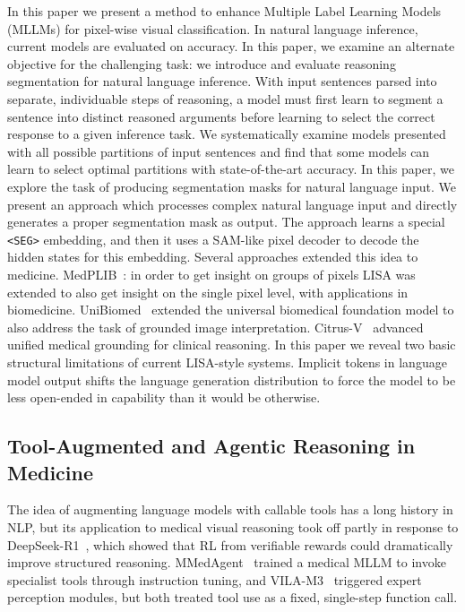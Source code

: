 \documentclass[12pt, a4paper]{article}
\begin{document}
In this paper we present a method to enhance Multiple Label Learning Models (MLLMs)
for pixel-wise visual classification.
In natural language inference, current models are evaluated on accuracy.
In this paper, we examine an alternate objective for the challenging task: we introduce
and evaluate reasoning segmentation for natural language inference.
With input sentences parsed into separate, individuable steps of reasoning, a model
must first learn to segment a sentence into distinct reasoned arguments before learning
to select the correct response to a given inference task.
We systematically examine models presented with all possible partitions of input
sentences and find that some models can learn to select optimal partitions with
state-of-the-art accuracy.
In this paper, we explore the task of producing segmentation masks for natural language
input.
We present an approach which processes complex natural language input and directly
generates a proper segmentation mask as output.
The approach learns a special \texttt{<SEG>} embedding, and then it uses a SAM-like
pixel decoder to decode the hidden states for this embedding.
Several approaches extended this idea to medicine.
MedPLIB~\cite{medplib}: in order to get insight on groups of pixels LISA was extended
to also get insight on the single pixel level, with applications in biomedicine.
UniBiomed~\cite{unibiomed} extended the universal biomedical foundation model to also
address the task of grounded image interpretation.
Citrus-V~\cite{citrusv} advanced unified medical grounding for clinical reasoning.
In this paper we reveal two basic structural limitations of current LISA-style systems.
Implicit tokens in language model output shifts the language generation distribution to
force the model to be less open-ended in capability than it would be otherwise.

\subsection{Tool-Augmented and Agentic Reasoning in Medicine}

The idea of augmenting language models with callable tools has a long history in NLP,
but its application to medical visual reasoning took off partly in response to
DeepSeek-R1~\cite{deepseekr1}, which showed that RL from verifiable rewards could
dramatically improve structured reasoning.
MMedAgent~\cite{mmedagent} trained a medical MLLM to invoke specialist tools through
instruction tuning, and VILA-M3~\cite{vilam3} triggered expert perception modules, but
both treated tool use as a fixed, single-step function call.
\end{document}
